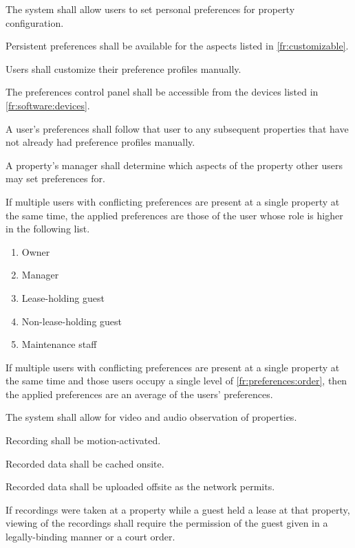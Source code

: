 \documentclass[letter,titlepage,oneside,english]{report}
\begin{document}
\begin{fr}
  The system shall allow users to set personal preferences for property configuration.
  \begin{fr}
  \item
    Persistent preferences shall be available for the aspects listed in \ref{fr:customizable}.
  \item
    Users shall customize their preference profiles manually.
  \item
    The preferences control panel shall be accessible from the devices listed in \ref{fr:software:devices}.
  \item
    A user's preferences shall follow that user to any subsequent properties that have not already had preference profiles manually.
  \item
    A property's manager shall determine which aspects of the property other users may set preferences for.
  \item\label{fr:preferences:order}
    If multiple users with conflicting preferences are present at a single property at the same time, the applied preferences are those of the user whose role is higher in the following list.
    \begin{enumerate}
    \item
      Owner
    \item
      Manager
    \item
      Lease-holding guest
    \item
      Non-lease-holding guest
    \item
      Maintenance staff
    \end{enumerate}
  \item
    If multiple users with conflicting preferences are present at a single property at the same time and those users occupy a single level of \ref{fr:preferences:order}, then the applied preferences are an average of the users' preferences.
  \end{fr}
\item
  The system shall allow for video and audio observation of properties.
  \begin{fr}
  \item
    Recording shall be motion-activated.
  \item
    Recorded data shall be cached onsite.
  \item
    Recorded data shall be uploaded offsite as the network permits.
  \item
    If recordings were taken at a property while a guest held a lease at that property, viewing of the recordings shall require the permission of the guest given in a legally-binding manner or a court order.

\end{fr}
\end{fr}
\end{document}
